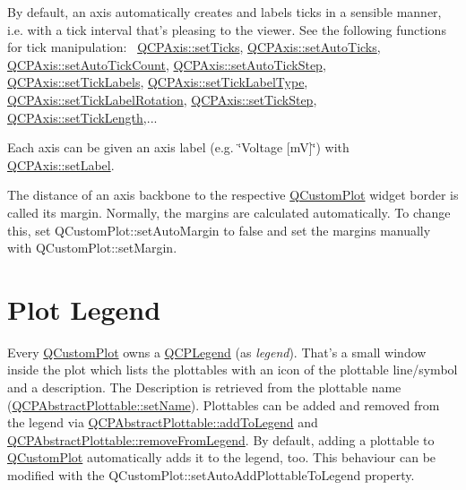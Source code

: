 By default, an axis automatically creates and labels ticks in a sensible manner, i.\+e. with a tick interval that's pleasing to the viewer. See the following functions for tick manipulation\+:~\newline
\hyperlink{a00025_ac891409315bc379e3b1abdb162c1a011}{Q\+C\+P\+Axis\+::set\+Ticks}, \hyperlink{a00025_ae867c23d3a6a7bd4d09cc66c5d018f63}{Q\+C\+P\+Axis\+::set\+Auto\+Ticks}, \hyperlink{a00025_a7c7111cbeac9ec5fcb40f93a1ef51a0b}{Q\+C\+P\+Axis\+::set\+Auto\+Tick\+Count}, \hyperlink{a00025_a99fe77b034e06f5b723995beab96e741}{Q\+C\+P\+Axis\+::set\+Auto\+Tick\+Step}, \hyperlink{a00025_a04ba16e1f6f78d70f938519576ed32c8}{Q\+C\+P\+Axis\+::set\+Tick\+Labels}, \hyperlink{a00025_a54f24f5ce8feea25209388a863d7e448}{Q\+C\+P\+Axis\+::set\+Tick\+Label\+Type}, \hyperlink{a00025_a1bddd4413df8a576b7ad4b067fb33375}{Q\+C\+P\+Axis\+::set\+Tick\+Label\+Rotation}, \hyperlink{a00025_af727db0acc6492c4c774c0700e738205}{Q\+C\+P\+Axis\+::set\+Tick\+Step}, \hyperlink{a00025_a62ec40bebe3540e9c1479a8fd2be3b0d}{Q\+C\+P\+Axis\+::set\+Tick\+Length},...

Each axis can be given an axis label (e.\+g. \char`\"{}\+Voltage \mbox{[}m\+V\mbox{]}\char`\"{}) with \hyperlink{a00025_a33bcc382c111c9f31bb0687352a2dea4}{Q\+C\+P\+Axis\+::set\+Label}.

The distance of an axis backbone to the respective \hyperlink{a00030_d8/d00/a00186}{Q\+Custom\+Plot} widget border is called its margin. Normally, the margins are calculated automatically. To change this, set Q\+Custom\+Plot\+::set\+Auto\+Margin to false and set the margins manually with Q\+Custom\+Plot\+::set\+Margin.\hypertarget{index_legend}{}\section{Plot Legend}\label{index_legend}
Every \hyperlink{a00030_d8/d00/a00186}{Q\+Custom\+Plot} owns a \hyperlink{a00045}{Q\+C\+P\+Legend} (as {\itshape legend}). That's a small window inside the plot which lists the plottables with an icon of the plottable line/symbol and a description. The Description is retrieved from the plottable name (\hyperlink{a00024_ab79c7ba76bc7fa89a4b3580e12149f1f}{Q\+C\+P\+Abstract\+Plottable\+::set\+Name}). Plottables can be added and removed from the legend via \hyperlink{a00024_a70f8cabfd808f7d5204b9f18c45c13f5}{Q\+C\+P\+Abstract\+Plottable\+::add\+To\+Legend} and \hyperlink{a00024_aa1f350e510326d012b9a9c9249736c83}{Q\+C\+P\+Abstract\+Plottable\+::remove\+From\+Legend}. By default, adding a plottable to \hyperlink{a00030_d8/d00/a00186}{Q\+Custom\+Plot} automatically adds it to the legend, too. This behaviour can be modified with the Q\+Custom\+Plot\+::set\+Auto\+Add\+Plottable\+To\+Legend property.

